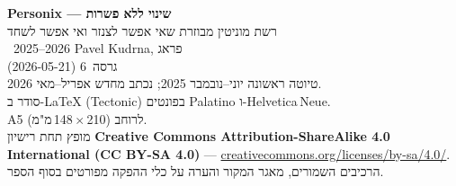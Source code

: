 \thispagestyle{empty}
\ifdefined\printmode\vspace*{\fill}\else{}\fi
\begin{flushleft}\small\sffamily
\textbf{Personix --- שינוי ללא פשרות}\\[0.3em]
רשת מוניטין מבוזרת שאי אפשר לצנזר ואי אפשר לשחד\\[1.4em]

\textcopyright\ 2025--2026 Pavel Kudrna, פראג\\[0.4em]

גרסה~6 (2026-05-21)\\
טיוטה ראשונה יוני--נובמבר 2025; נכתב מחדש אפריל--מאי 2026.\\[1.4em]

סודר ב-\LaTeX{} (Tectonic) בפונטים Palatino ו-Helvetica\,Neue.\\
A5 לרוחב (210\,$\times$\,148\,מ"מ).\\[1.4em]

מופץ תחת רישיון \textbf{Creative Commons Attribution-ShareAlike 4.0
International (CC BY-SA 4.0)} ---
\href{https://creativecommons.org/licenses/by-sa/4.0/}{creativecommons.org/licenses/by-sa/4.0/}.
הרכיבים השמורים, מאגר המקור והערה על כלי ההפקה
מפורטים בסוף הספר.
\end{flushleft}
\ifdefined\printmode\else{}\fi
\clearpage
